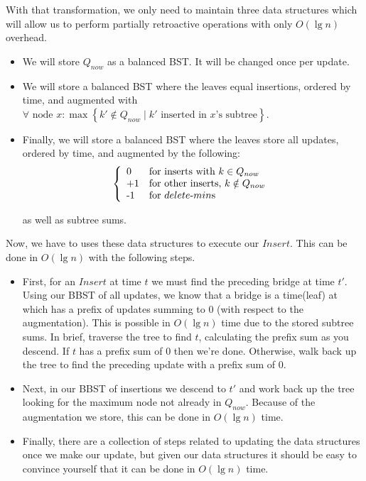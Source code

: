 \documentclass[11pt]{article}
\begin{document}
With that transformation, we only need to maintain three data structures which will allow us to perform partially retroactive operations with only $O(\lg n)$ overhead.

\begin{itemize}
\item We will store $Q_{now}$ as a balanced BST.  It will be changed once per update.
\item We will store a balanced BST where the leaves equal insertions, ordered by time, and augmented with $\forall \text{ node } x: \max\left\{ k' \notin Q_{now} \mid k' \text{ inserted in } x \text{'s subtree} \right\}$.

\item Finally, we will store a balanced BST where the leaves store all updates, ordered by time, and augmented by the following: \\

\[
\left\{ \begin{array}{ll}
$0$ & \mbox{for inserts with $k \in Q_{now}$} \\
$+1$ & \mbox{for other inserts, $k \notin Q_{now}$} \\
$-1$ & \mbox{for $delete$-$min$s} \\
\end{array}
\right. \\
\]

as well as subtree sums.

\end{itemize}

Now, we have to uses these data structures to execute our $Insert$.  This can be done in $O(\lg n)$ with the following steps.

\begin{itemize}
	\item First, for an $Insert$ at time $t$ we must find the preceding bridge at time $t'$.  Using our BBST of all updates, we know that a bridge is a time(leaf) at which has a prefix of updates summing to 0 (with respect to the augmentation). This is possible in $O(\lg n)$ time due to the stored subtree sums.  In brief, traverse the tree to find $t$, calculating the prefix sum as you descend.  If $t$ has a prefix sum of $0$ then we're done. Otherwise, walk back up the tree to find the preceding update with a prefix sum of $0$.

\item Next, in our BBST of insertions we descend to $t'$ and work back up the tree looking for the maximum node not already in $Q_{now}$.  Because of the augmentation we store, this can be done in $O(\lg n)$ time.

\item Finally, there are a collection of steps related to updating the data structures once we make our update, but given our data structures it should be easy to convince yourself that it can be done in $O(\lg n)$ time.
\end{itemize}
\end{document}
